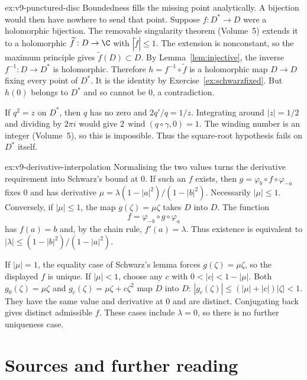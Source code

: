\begin{solution}{ex:v9-punctured-disc}
\idea Boundedness fills the missing point analytically. A bijection would
then have nowhere to send that point.
\writeup Suppose $f:D^*\to D$ were a holomorphic bijection.
The removable singularity theorem (Volume~5) extends it to a holomorphic
$\widetilde f:D\to\C$ with $|\widetilde f|\le1$.
The extension is nonconstant, so the maximum principle gives
$\widetilde f(D)\subset D$. By Lemma~\ref{lem:injective}, the inverse
$f^{-1}:D\to D^*$ is holomorphic. Therefore
$h=f^{-1}\circ\widetilde f$ is a holomorphic map $D\to D$ fixing every
point of $D^*$. It is the identity by Exercise~\ref{ex:schwarzfixed}.
But $h(0)$ belongs to $D^*$ and so cannot be $0$, a contradiction.

If $q^2=z$ on $D^*$, then $q$ has no zero and $2q'/q=1/z$.
Integrating around $|z|=1/2$ and dividing by $2\pi i$ would give
$2\,\operatorname{wind}(q\circ\gamma,0)=1$.
The winding number is an integer (Volume~5), so this is impossible.
Thus the square-root hypothesis fails on $D^*$ itself.
\end{solution}

\begin{solution}{ex:v9-derivative-interpolation}
\idea Normalising the two values turns the derivative requirement into
Schwarz's bound at $0$.
\writeup If such an $f$ exists, then
$g=\varphi_b\circ f\circ\varphi_{-a}$ fixes $0$ and has derivative
$\mu=\lambda(1-|a|^2)/(1-|b|^2)$. Necessarily $|\mu|\le1$.
Conversely, if $|\mu|\le1$, the map $g(\zeta)=\mu\zeta$ takes $D$
into $D$. The function
\[
 f=\varphi_{-b}\circ g\circ\varphi_a
\]
has $f(a)=b$ and, by the chain rule, $f'(a)=\lambda$.
Thus existence is equivalent to
$|\lambda|\le(1-|b|^2)/(1-|a|^2)$.

If $|\mu|=1$, the equality case of Schwarz's lemma forces
$g(\zeta)=\mu\zeta$, so the displayed $f$ is unique.
If $|\mu|<1$, choose any $c$ with $0<|c|<1-|\mu|$.
Both $g_0(\zeta)=\mu\zeta$ and
$g_c(\zeta)=\mu\zeta+c\zeta^2$ map $D$ into $D$:
$|g_c(\zeta)|\le(|\mu|+|c|)|\zeta|<1$.
They have the same value and derivative at $0$ and are distinct.
Conjugating back gives distinct admissible $f$. These cases include
$\lambda=0$, so there is no further uniqueness case.
\end{solution}

\section*{Sources and further reading}

